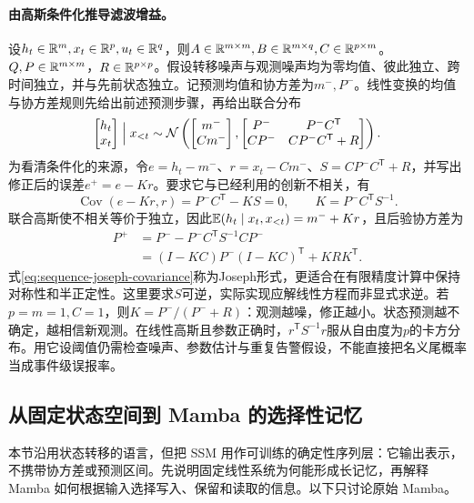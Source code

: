 \paragraph{由高斯条件化推导滤波增益。}
设$h_t\in\mathbb{R}^m,x_t\in\mathbb{R}^p,u_t\in\mathbb{R}^q$，则$A\in\mathbb{R}^{m\times m},B\in\mathbb{R}^{m\times q},C\in\mathbb{R}^{p\times m}$。$Q,P\in\mathbb{R}^{m\times m}$，$R\in\mathbb{R}^{p\times p}$。假设转移噪声与观测噪声均为零均值、彼此独立、跨时间独立，并与先前状态独立。记预测均值和协方差为$m^-,P^-$。线性变换的均值与协方差规则先给出前述预测步骤，再给出联合分布
\begin{equation}
 \begin{bmatrix}h_t\\x_t\end{bmatrix}\Bigm|x_{<t}
 \sim\mathcal N\left(
 \begin{bmatrix}m^-\\Cm^-\end{bmatrix},
 \begin{bmatrix}P^-&P^-C^{\mathsf T}\\CP^-&CP^-C^{\mathsf T}+R\end{bmatrix}\right).
\end{equation}
为看清条件化的来源，令$e=h_t-m^-$、$r=x_t-Cm^-$、$S=CP^-C^{\mathsf T}+R$，并写出修正后的误差$e^+=e-Kr$。要求它与已经利用的创新不相关，有
\begin{equation}
 \operatorname{Cov}(e-Kr,r)=P^-C^{\mathsf T}-KS=0,
 \qquad K=P^-C^{\mathsf T}S^{-1}.
\end{equation}
联合高斯使不相关等价于独立，因此$\mathbb{E}(h_t\mid x_t,x_{<t})=m^-+Kr$，且后验协方差为
\begin{align}
 P^+&=P^--P^-C^{\mathsf T}S^{-1}CP^-\\
 &=(I-KC)P^-(I-KC)^{\mathsf T}+KRK^{\mathsf T}.\label{eq:sequence-joseph-covariance}
\end{align}
式\eqref{eq:sequence-joseph-covariance}称为Joseph形式，更适合在有限精度计算中保持对称性和半正定性。这里要求$S$可逆，实际实现应解线性方程而非显式求逆。若$p=m=1,C=1$，则$K=P^-/(P^-+R)$：观测越噪，修正越小。状态预测越不确定，越相信新观测。在线性高斯且参数正确时，$r^{\mathsf T}S^{-1}r$服从自由度为$p$的卡方分布。用它设阈值仍需检查噪声、参数估计与重复告警假设，不能直接把名义尾概率当成事件级误报率。

\subsection{从固定状态空间到 Mamba 的选择性记忆}
\label{sec:sequence-mamba}
本节沿用状态转移的语言，但把 SSM 用作可训练的确定性序列层：它输出表示，不携带协方差或预测区间。先说明固定线性系统为何能形成长记忆，再解释 Mamba 如何根据输入选择写入、保留和读取的信息。以下只讨论原始 Mamba。

